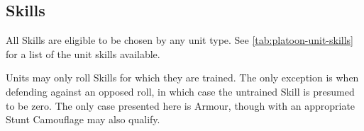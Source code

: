 \subsection{Skills}
\label{sec:platoon-combat-skills}

All Skills are eligible to be chosen by any unit type. See \autoref{tab:platoon-unit-skills} for a list of the unit skills available.



Units may only roll Skills for which they are trained. The only
exception is when defending against an opposed roll, in which case the
untrained Skill is presumed to be zero. The only case presented here
is Armour, though with an appropriate Stunt  Camouflage may also
qualify.

